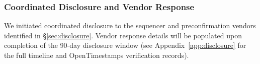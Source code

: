 %

\subsubsection{Coordinated Disclosure and Vendor Response}
\label{sec:pefo-disclosure-PLACEHOLDER}

We initiated coordinated disclosure to the sequencer and preconfirmation
vendors identified in \S\ref{sec:disclosure}. Vendor response details
will be populated upon completion of the 90-day disclosure window
(see Appendix~\ref{app:disclosure} for the full timeline and
OpenTimestamps verification records).
